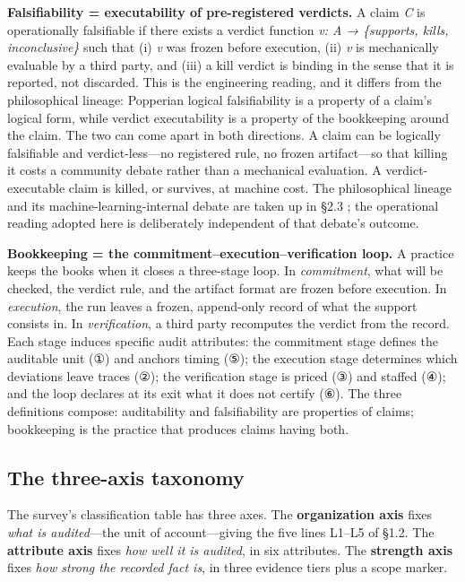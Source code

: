 \documentclass[11pt,a4paper]{article}
\begin{document}
\textbf{Falsifiability = executability of pre-registered verdicts.} A claim \textit{C} is operationally falsifiable if there exists a verdict function \textit{v: A → \{supports, kills, inconclusive\}} such that (i) \textit{v} was frozen before execution, (ii) \textit{v} is mechanically evaluable by a third party, and (iii) a kill verdict is binding in the sense that it is reported, not discarded. This is the engineering reading, and it differs from the philosophical lineage: Popperian logical falsifiability is a property of a claim's logical form, while verdict executability is a property of the bookkeeping around the claim. The two can come apart in both directions. A claim can be logically falsifiable and verdict-less—no registered rule, no frozen artifact—so that killing it costs a community debate rather than a mechanical evaluation. A verdict-executable claim is killed, or survives, at machine cost. The philosophical lineage and its machine-learning-internal debate are taken up in §2.3 \cite{key27,key28}; the operational reading adopted here is deliberately independent of that debate's outcome.

\textbf{Bookkeeping = the commitment–execution–verification loop.} A practice keeps the books when it closes a three-stage loop. In \textit{commitment}, what will be checked, the verdict rule, and the artifact format are frozen before execution. In \textit{execution}, the run leaves a frozen, append-only record of what the support consists in. In \textit{verification}, a third party recomputes the verdict from the record. Each stage induces specific audit attributes: the commitment stage defines the auditable unit (①) and anchors timing (⑤); the execution stage determines which deviations leave traces (②); the verification stage is priced (③) and staffed (④); and the loop declares at its exit what it does not certify (⑥). The three definitions compose: auditability and falsifiability are properties of claims; bookkeeping is the practice that produces claims having both.

\subsection{The three-axis taxonomy}

The survey's classification table has three axes. The \textbf{organization axis} fixes \textit{what is audited}—the unit of account—giving the five lines L1–L5 of §1.2. The \textbf{attribute axis} fixes \textit{how well it is audited}, in six attributes. The \textbf{strength axis} fixes \textit{how strong the recorded fact is}, in three evidence tiers plus a scope marker.
\end{document}
